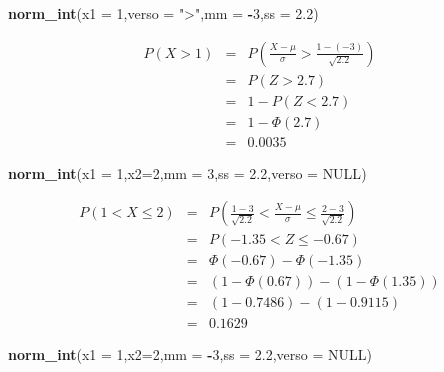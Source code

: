 \documentclass[
  11pt,
]{book}
\newenvironment{Shaded}{\begin{snugshade}}{\end{snugshade}}
\newcommand{\AttributeTok}[1]{\textcolor[rgb]{0.13,0.29,0.53}{#1}}
\newcommand{\ConstantTok}[1]{\textcolor[rgb]{0.56,0.35,0.01}{#1}}
\newcommand{\DecValTok}[1]{\textcolor[rgb]{0.00,0.00,0.81}{#1}}
\newcommand{\FloatTok}[1]{\textcolor[rgb]{0.00,0.00,0.81}{#1}}
\newcommand{\FunctionTok}[1]{\textcolor[rgb]{0.13,0.29,0.53}{\textbf{#1}}}
\newcommand{\NormalTok}[1]{#1}
\newcommand{\SpecialCharTok}[1]{\textcolor[rgb]{0.81,0.36,0.00}{\textbf{#1}}}
\newcommand{\StringTok}[1]{\textcolor[rgb]{0.31,0.60,0.02}{#1}}
\theoremstyle{mytheoremstyle}
\theoremstyle{mydefstyle}
\begin{document}
\begin{Shaded}
\begin{Highlighting}[]
\FunctionTok{norm\_int}\NormalTok{(}\AttributeTok{x1 =} \DecValTok{1}\NormalTok{,}\AttributeTok{verso =} \StringTok{"\textgreater{}"}\NormalTok{,}\AttributeTok{mm =} \SpecialCharTok{{-}}\DecValTok{3}\NormalTok{,}\AttributeTok{ss =} \FloatTok{2.2}\NormalTok{)}
\end{Highlighting}
\end{Shaded}

\begin{eqnarray*}
      P( X   >   1 ) 
        &=& P\left(  \frac { X  -  \mu }{ \sigma }  >  \frac { 1  -  ( -3 ) }{\sqrt{ 2.2 }} \right)  \\
                 &=& P\left(  Z   >   2.7 \right) \\    &=& 1-P(Z< 2.7 )\\ 
                 &=&  1-\Phi( 2.7 ) \\ &=&  0.0035 
      \end{eqnarray*}

\begin{Shaded}
\begin{Highlighting}[]
\FunctionTok{norm\_int}\NormalTok{(}\AttributeTok{x1 =} \DecValTok{1}\NormalTok{,}\AttributeTok{x2=}\DecValTok{2}\NormalTok{,}\AttributeTok{mm =} \DecValTok{3}\NormalTok{,}\AttributeTok{ss =} \FloatTok{2.2}\NormalTok{,}\AttributeTok{verso =} \ConstantTok{NULL}\NormalTok{)}
\end{Highlighting}
\end{Shaded}

\begin{eqnarray*}
   P( 1 < X \leq  2 ) &=& P\left( \frac { 1  -  3 }{\sqrt{ 2.2 }} < \frac { X  -  \mu }{ \sigma } \leq \frac { 2  -  3 }{\sqrt{ 2.2 }}\right)  \\
              &=& P\left(  -1.35  < Z \leq  -0.67 \right) \\
              &=& \Phi( -0.67 )-\Phi( -1.35 )\\
              &=&  (1-\Phi( 0.67 ))-(1-\Phi( 1.35 )) \\ &=& (1- 0.7486 )-(1- 0.9115 ) \\ 
              &=&  0.1629 
   \end{eqnarray*}

\begin{Shaded}
\begin{Highlighting}[]
\FunctionTok{norm\_int}\NormalTok{(}\AttributeTok{x1 =} \DecValTok{1}\NormalTok{,}\AttributeTok{x2=}\DecValTok{2}\NormalTok{,}\AttributeTok{mm =} \SpecialCharTok{{-}}\DecValTok{3}\NormalTok{,}\AttributeTok{ss =} \FloatTok{2.2}\NormalTok{,}\AttributeTok{verso =} \ConstantTok{NULL}\NormalTok{)}
\end{Highlighting}
\end{Shaded}
\end{document}
